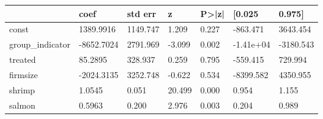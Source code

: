 \begin{tabular}{lllllll}
\toprule
 & coef & std err & z & P>|z| & [0.025 & 0.975] \\
\midrule
const &  1389.9916 &  1149.747 &     1.209 &  0.227 &  -863.471 &  3643.454 \\
group_indicator & -8652.7024 &  2791.969 &    -3.099 &  0.002 & -1.41e+04 & -3180.543 \\
treated &    85.2895 &   328.937 &     0.259 &  0.795 &  -559.415 &   729.994 \\
firmsize & -2024.3135 &  3252.748 &    -0.622 &  0.534 & -8399.582 &  4350.955 \\
shrimp &     1.0545 &     0.051 &    20.499 &  0.000 &     0.954 &     1.155 \\
salmon &     0.5963 &     0.200 &     2.976 &  0.003 &     0.204 &     0.989 \\
\bottomrule
\end{tabular}
